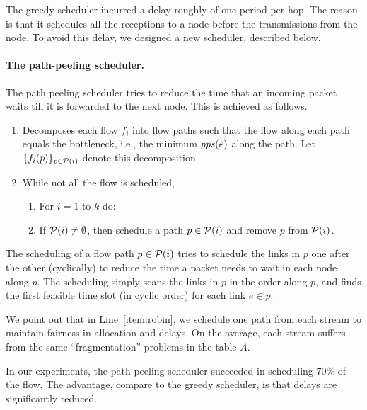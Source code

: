 \documentclass[12pt,oneside,english,a4paper]{book}
\theoremstyle{plain}
\theoremstyle{definition}
\theoremstyle{Theorem}
\theoremstyle{plain}
\newenvironment{proof sketch}[1]{\noindent {\emph{Proof sketch of #1:}}}{\hfill \qed}
\newcommand{\pps}{\text{\emph{pps}}}
\begin{document}
 The greedy scheduler incurred a delay roughly of
  one period per hop. The reason is that it schedules all the
  receptions to a node before the transmissions from the node. To
  avoid this delay, we designed a new scheduler, described below.

\paragraph{The path-peeling scheduler.}
The path peeling scheduler tries to reduce the time that an incoming
packet waits till it is forwarded to the next node. This is achieved
as follows.
\begin{enumerate}
\item Decomposes each flow $f_i$ into flow paths such that the flow
  along each path equals the bottleneck, i.e., the minimum $\pps(e)$ along the path.  Let
  $\{f_i(p)\}_{p\in {\cal{P}}(i)}$ denote this decomposition.
\item While not all the flow is scheduled,
  \begin{enumerate}
  \item \label{item:robin} For $i=1$ to $k$ do:
  \item If ${\cal P}(i)\neq \emptyset$, then schedule a path $p\in {\cal P}(i)$ and remove $p$ from ${\cal P}(i)$.
  \end{enumerate}
\end{enumerate}
The scheduling of a flow path $p\in {\cal P}(i)$ tries to schedule the links in
$p$ one after the other (cyclically) to reduce the time a packet needs to wait in each node
along $p$. The scheduling simply scans the links in $p$ in the order
along $p$, and finds the first feasible time slot (in cyclic order) for
each link $e\in p$.

We point out that in Line~\ref{item:robin}, we schedule one path from
each stream to maintain fairness in allocation and delays. On the average, each stream
suffers from the same ``fragmentation'' problems in the table $A$.

In our experiments, the path-peeling scheduler succeeded in scheduling
70\% of the flow. The advantage, compare to the greedy
scheduler, is that delays are significantly reduced.
\end{document}
